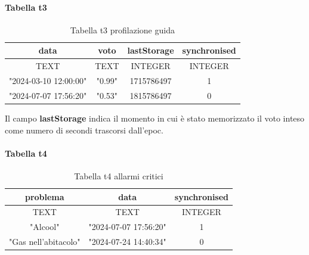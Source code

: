 \documentclass[12pt, a4paper, italian]{report}
\numberwithin{figure}{chapter}
\numberwithin{table}{chapter}
\begin{document}
\paragraph{Tabella t3}
\begin{table}[h!]
  \centering 
  \begin{adjustbox}{max width=\textwidth}
    \begin{tabular}{|c|c|c|c|}
      \hline
      \textbf{data} & \textbf{voto} & \textbf{lastStorage} & \textbf{synchronised} \\
      \hline
      TEXT & TEXT & INTEGER & INTEGER \\
      \hline
      "2024-03-10 12:00:00" & "0.99" & 1715786497 & 1 \\
      \hline
      "2024-07-07 17:56:20" & "0.53" & 1815786497 & 0 \\
      \hline
    \end{tabular}
  \end{adjustbox}
  \caption{Tabella t3 profilazione guida}
  \label{tab:t3 profilazione}
\end{table}
Il campo \textbf{lastStorage} indica il momento in cui è stato memorizzato il voto inteso come numero di secondi trascorsi dall'epoc.

\paragraph{Tabella t4}
\begin{table}[h!]
  \centering 
  \begin{adjustbox}{max width=\textwidth}
    \begin{tabular}{|c|c|c|}
      \hline
      \textbf{problema} & \textbf{data} & \textbf{synchronised} \\
      \hline
      TEXT & TEXT & INTEGER \\
      \hline
      "Alcool" & "2024-07-07 17:56:20" & 1 \\
      \hline
      "Gas nell'abitacolo" & "2024-07-24 14:40:34" & 0   \\
      \hline
    \end{tabular}
  \end{adjustbox}
  \caption{Tabella t4 allarmi critici}
  \label{tab:t4 allarmi critici}
\end{table}
\end{document}
